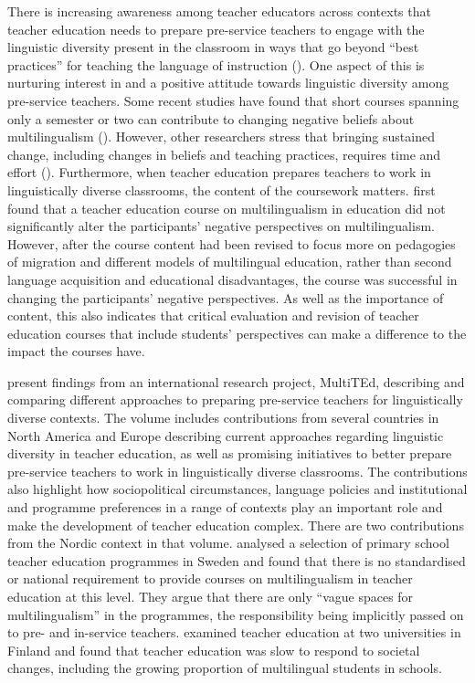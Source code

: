 \documentclass[output=paper]{langscibook}
\begin{document}
There is increasing awareness among teacher educators across contexts that teacher education needs to prepare pre-service teachers to engage with the linguistic diversity present in the classroom in ways that go beyond “best practices” for teaching the language of instruction (\citealt{OjhaEtAl2024}). One aspect of this is nurturing interest in and a positive attitude towards linguistic diversity among pre-service teachers. Some recent studies have found that short courses spanning only a semester or two can contribute to changing negative beliefs about multilingualism (\citealt{Aleksic2023,Mahalingappa2024,SchroedlerEtAl2023}). However, other researchers stress that bringing sustained change, including changes in beliefs and teaching practices, requires time and effort (\citealt{Duarte2022,KirschEtAl2020}). Furthermore, when teacher education prepares teachers to work in linguistically diverse classrooms, the content of the coursework matters. \citet{DollGuldenschuh2023} first found that a teacher education course on multilingualism in education did not significantly alter the participants’ negative perspectives on multilingualism. However, after the course content had been revised to focus more on pedagogies of migration and different models of multilingual education, rather than second language acquisition and educational disadvantages, the course was successful in changing the participants’ negative perspectives. As well as the importance of content, this also indicates that critical evaluation and revision of teacher education courses that include students’ perspectives can make a difference to the impact the courses have.

\citet{WernickeEtAl2021} present findings from an international research project, MultiTEd, describing and comparing different approaches to preparing pre\hyp service teachers for linguistically diverse contexts. The volume includes contributions from several countries in North America and Europe describing current approaches regarding linguistic diversity in teacher education, as well as promising initiatives to better prepare pre-service teachers to work in linguistically diverse classrooms. The contributions also highlight how sociopolitical circumstances, language policies and institutional and programme preferences in a range of contexts play an important role and make the development of teacher education complex. There are two contributions from the Nordic context in that volume. \citet{PaulsrudLundberg2021} analysed a selection of primary school teacher education programmes in Sweden and found that there is no standardised or national requirement to provide courses on multilingualism in teacher education at this level. They argue that there are only “vague spaces for multilingualism” \citep[55]{PaulsrudLundberg2021} in the programmes, the responsibility being implicitly passed on to pre- and in-service teachers. \citet{Szabo2021} examined teacher education at two universities in Finland and found that teacher education was slow to respond to societal changes, including the growing proportion of multilingual students in schools.
\end{document}
